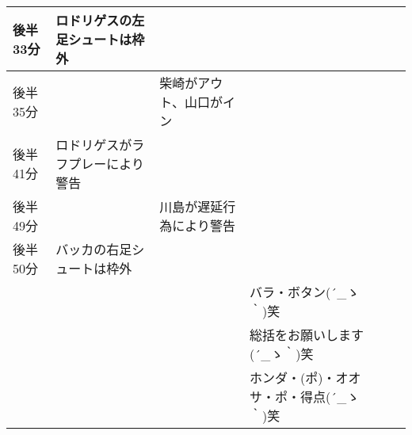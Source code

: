 \begin{table}[htb]
{\begin{tabular}{|l|l|l|l|l|l|}
      後半33分  & ロドリゲスの左足シュートは枠外               &                                       &   \\ \hline
      後半35分  &                                              & 柴崎がアウト、山口がイン              &   \\ \hline
      後半41分  & ロドリゲスがラフプレーにより警告             &                                       &   \\ \hline
      後半49分  &                                              & 川島が遅延行為により警告              & \\ \hline
      後半50分  & バッカの右足シュートは枠外                   &                                       &  \\ \hline
                &                                              &                                       & バラ・ボタン\sf (´\_ゝ｀)笑 \\ \hline
                &                                              &                                       & 総括をお願いします\sf (´\_ゝ｀)笑 \\ \hline
                &                                              &                                       & ホンダ・(ポ)・オオサ・ポ・得点\sf (´\_ゝ｀)笑 \\ \hline
    \end{tabular}
    }
\end{table}
